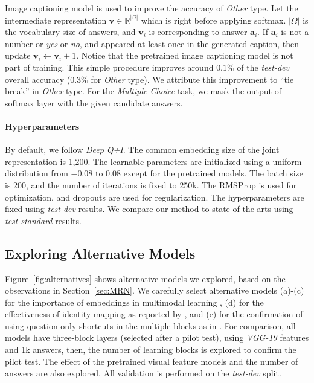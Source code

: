 \documentclass{article}
\newcommand{\vv}[0]{\mathbf{v}}
\newcommand{\va}[0]{\mathbf{a}}
\begin{document}
Image captioning model \cite{Karpathy} is used to improve the accuracy of \textit{Other} type. Let the intermediate representation $\vv \in \mathbb{R}^{|\Omega|}$ which is right before applying softmax. $|\Omega|$ is the vocabulary size of answers, and $\vv_i$ is corresponding to answer $\va_i$. If $\va_i$ is not a number or \textit{yes} or \textit{no}, and appeared at least once in the generated caption, then update $\vv_i \leftarrow \vv_i + 1$. Notice that the pretrained image captioning model is not part of training. This simple procedure improves around $0.1\%$ of the \textit{test-dev} overall accuracy ($0.3\%$ for \textit{Other} type). We attribute this improvement to ``tie break'' in \textit{Other} type. For the \textit{Multiple-Choice} task, we mask the output of softmax layer with the given candidate answers.

\paragraph{Hyperparameters}

By default, we follow \textit{Deep Q+I}. The common embedding size of the joint representation is 1,200. The learnable parameters are initialized using a uniform distribution from $-0.08$ to $0.08$ except for the pretrained models. The batch size is 200, and the number of iterations is fixed to 250k. The RMSProp \cite{Tieleman2012} is used for optimization, and dropouts \cite{Hinton2012,Gal2015} are used for regularization. The hyperparameters are fixed using \textit{test-dev} results. We compare our method to state-of-the-arts using \textit{test-standard} results.

\subsection{Exploring Alternative Models}
\label{subsec:alternatives}

Figure~\ref{fig:alternatives} shows alternative models we explored, based on the observations in Section~\ref{sec:MRN}. We carefully select alternative models (a)-(c) for the importance of embeddings in multimodal learning \cite{Ngiam2011,srivastava12mm}, (d) for the effectiveness of identity mapping as reported by \cite{He2015}, and (e) for the confirmation of using question-only shortcuts in the multiple blocks as in \cite{Yang2015}. For comparison, all models have three-block layers (selected after a pilot test), using \textit{VGG-19} features and 1k answers, then, the number of learning blocks is explored to confirm the pilot test. The effect of the pretrained visual feature models and the number of answers are also explored. All validation is performed on the \textit{test-dev} split.
\end{document}
